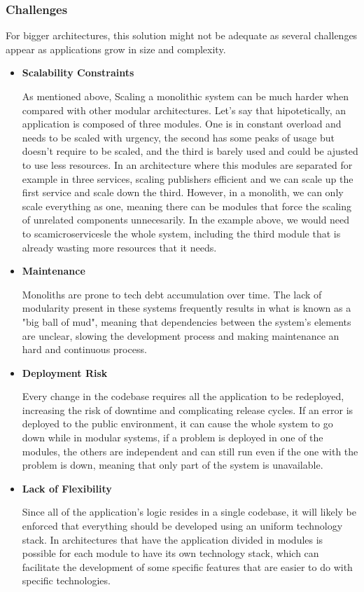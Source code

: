 \subsubsection{Challenges}
For bigger architectures, this solution might not be adequate as several
challenges appear as applications grow in size and complexity.
\begin{itemize}
	\item \textbf{Scalability Constraints}

	      As mentioned above, Scaling a monolithic system can be much harder when
	      compared with other modular architectures. Let's say that hipotetically,
	      an application is composed of three modules. One is in constant
	      overload and needs to be scaled with urgency, the second has some peaks of
	      usage but doesn't require to be scaled, and the third is barely used and
	      could be ajusted to use less resources. In an architecture where this
	      modules are separated for example in three services, scaling publishers
	      efficient and we can scale up the first service and scale down the third.
	      However, in a monolith, we can only scale everything as one, meaning there
	      can be modules that force the scaling of unrelated components unnecesarily.
	      In the example above, we would need to scamicroservicesle the whole system, including
	      the third module that is already wasting more resources that it needs\cite{7333476,AWSMonolithMicroservices}.
	\item \textbf{Maintenance}

	      Monoliths are prone to tech debt accumulation over time. The lack
	      of modularity present in these systems frequently results in what is known as a
	      "big ball of mud", meaning that dependencies between the system's elements are
	      unclear, slowing the development process and making maintenance an
	      hard and continuous process\cite{7333476}.

	\item \textbf{Deployment Risk}

	      Every change in the codebase requires all the application to be redeployed,
	      increasing the risk of downtime and complicating release cycles. If an error
	      is deployed to the public environment, it can cause the whole system to go
	      down while in modular systems, if a problem is deployed in one of the
	      modules, the others are independent and can still run even if the one with
	      the problem is down, meaning that only part of the system is unavailable\cite{7333476,AWSMonolithMicroservices}.

	\item \textbf{Lack of Flexibility}

	      Since all of the application's logic resides in a single codebase, it will
	      likely be enforced that everything should be developed using an uniform
	      technology stack. In architectures that have the application divided in
	      modules is possible for each module to have its own technology stack,
	      which can facilitate the development of some specific features that are
	      easier to do with specific technologies\cite{IBMMonolith}.
\end{itemize}

